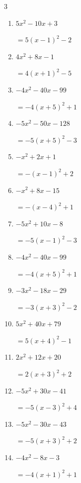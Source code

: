 \begin{multicols}{3}
\begin{enumerate}
  \item $5x^{2}-10x+3$

        $=5\left( x-1\right)^{2}-2$

  \item $4x^{2}+8x-1$

        $=4\left( x+1\right)^{2}-5$

  \item $-4x^{2}-40x-99$

        $=-4\left( x+5\right)^{2}+1$

  \item $-5x^{2}-50x-128$

        $=-5\left( x+5\right)^{2}-3$

  \item $-x^{2}+2x+1$

        $=-\left( x-1\right)^{2}+2$

\columnbreak %

  \item $-x^{2}+8x-15$

        $=-\left( x-4\right)^{2}+1$

  \item $-5x^{2}+10x-8$

        $=-5\left( x-1\right)^{2}-3$

  \item $-4x^{2}-40x-99$

        $=-4\left( x+5\right)^{2}+1$

  \item $-3x^{2}-18x-29$

        $=-3\left( x+3\right)^{2}-2$

  \item $5x^{2}+40x+79$

        $=5\left( x+4\right)^{2}-1$

  \item $2x^{2}+12x+20$

        $=2\left( x+3\right)^{2}+2$

  \item $-5x^{2}+30x-41$

        $=-5\left( x-3\right)^{2}+4$

  \item $-5x^{2}-30x-43$

        $=-5\left( x+3\right)^{2}+2$

  \item $-4x^{2}-8x-3$

        $=-4\left( x+1\right)^{2}+1$


\end{enumerate}
\end{multicols}
